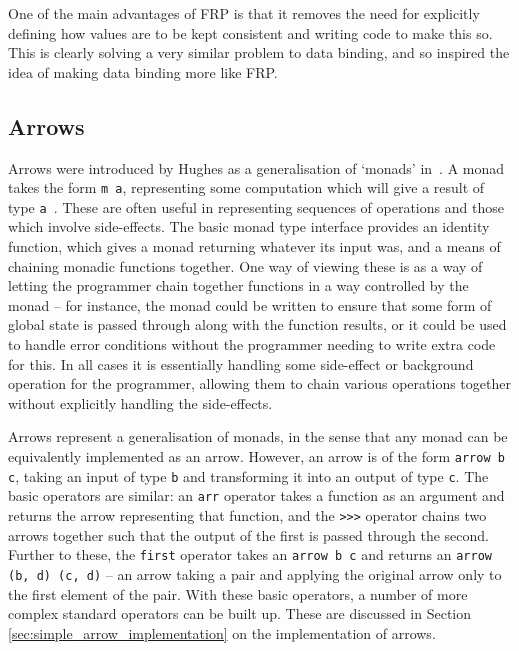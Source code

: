 \documentclass[12pt,twoside,notitlepage]{report}
\begin{document}
One of the main advantages of FRP is that it removes the need for explicitly defining how values are to be kept consistent and writing code to make this so. This is clearly solving a very similar problem to data binding, and so inspired the idea of making data binding more like FRP.

\subsection{Arrows}

Arrows were introduced by Hughes as a generalisation of `monads' in~\cite{hughes_arrows}. A monad takes the form \texttt{m a}, representing some computation which will give a result of type \texttt{a}~\cite{monads}. These are often useful in representing sequences of operations and those which involve side-effects. The basic monad type interface provides an identity function, which gives a monad returning whatever its input was, and a means of chaining monadic functions together. One way of viewing these is as a way of letting the programmer chain together functions in a way controlled by the monad -- for instance, the monad could be written to ensure that some form of global state is passed through along with the function results, or it could be used to handle error conditions without the programmer needing to write extra code for this. In all cases it is essentially handling some side-effect or background operation for the programmer, allowing them to chain various operations together without explicitly handling the side-effects.

Arrows represent a generalisation of monads, in the sense that any monad can be equivalently implemented as an arrow. However, an arrow is of the form \texttt{arrow b c}, taking an input of type \texttt{b} and transforming it into an output of type \texttt{c}. The basic operators are similar: an \texttt{arr} operator takes a function as an argument and returns the arrow representing that function, and the \texttt{>>>} operator chains two arrows together such that the output of the first is passed through the second. Further to these, the \texttt{first} operator takes an \texttt{arrow b c} and returns an \texttt{arrow (b, d) (c, d)} -- an arrow taking a pair and applying the original arrow only to the first element of the pair. With these basic operators, a number of more complex standard operators can be built up. These are discussed in Section \ref{sec:simple_arrow_implementation} on the implementation of arrows.
\end{document}
